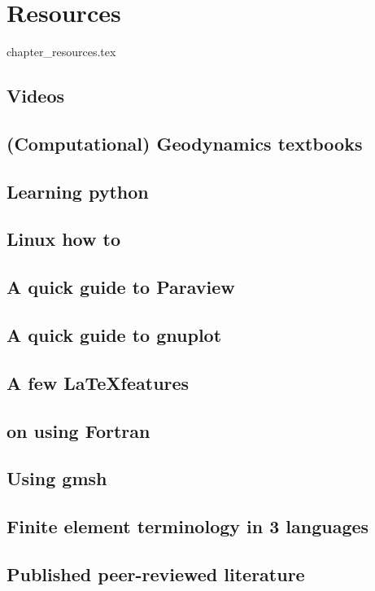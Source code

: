 \chapter{Resources}

\begin{flushright} {\tiny {\color{gray} chapter\_resources.tex}} \end{flushright}

\section{Videos}  %
\section{(Computational) Geodynamics textbooks}  %
\section{Learning python}  %
\section{Linux how to}  %
\section{A quick guide to Paraview}\label{app:paraview}  %
\section{A quick guide to gnuplot} \label{app:gnuplot}  %
\section{A few \LaTeX features}  %
\section{on using Fortran}  %
\section{Using gmsh \label{app:gmsh}}  %
\section{Finite element terminology in 3 languages}  %
\section{Published peer-reviewed literature}  %
